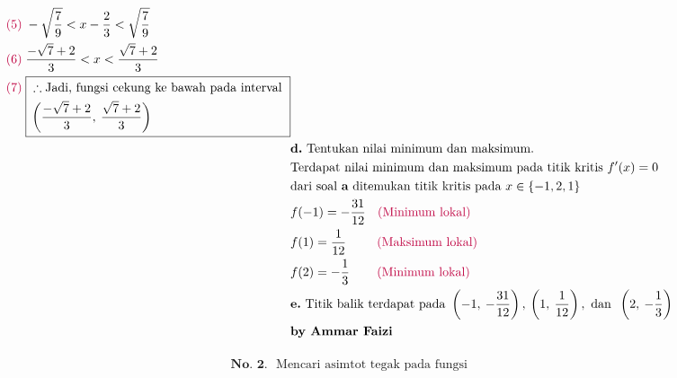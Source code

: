 \documentclass[13pt]{article}
\begin{document}
\begin{fleqn}[4em]
\begin{align*}
{\begin{aligned}
{\begin{aligned}[t]
    & {\color{purple}(5)}\; -\sqrt{\frac{7}{9}}<x-\frac{2}{3}<\sqrt{\frac{7}{9}} \\
    & {\color{purple}(6)}\; \frac{-\sqrt{7}+2}{3}<x<\frac{\sqrt{7}+2}{3} \\
    & {\color{purple}(7)}\; \boxed{
      \begin{aligned}[t]
        & \therefore \text{Jadi, fungsi cekung ke bawah pada interval } \\
        & \left(\frac{-\sqrt{7}+2}{3},\:\frac{\sqrt{7}+2}{3}\right)
      \end{aligned} 
    }
  \end{aligned}} \\
  & \textbf{d.} \text{ Tentukan nilai minimum dan maksimum.} \\
  & \text{Terdapat nilai minimum dan maksimum pada titik kritis } f'(x) = 0 \\
  & \text{dari soal } \textbf{a} \text{ ditemukan titik kritis pada } x \in \left\{-1, 2, 1\right\} \\
  & f(-1) = -\frac{31}{12}\:~\:\,\text{\color{purple} (Minimum lokal)}\\
  & f(1)  = \frac{1}{12}\:~\:~\:~\:~\:\text{\color{purple} (Maksimum lokal)}\\
  & f(2)  = -\frac{1}{3}\:~\:~\:~\:\;\text{\color{purple} (Minimum lokal)}\\
  & \textbf{e.} \text{ Titik balik terdapat pada } \left(-1,\:-\frac{31}{12}\right),\:\left(1,\:\frac{1}{12}\right), \text{ dan } \:\left(2,\:-\frac{1}{3}\right)
  \\ & \textbf{by Ammar Faizi}
\end{aligned}}
\end{align*}

\begin{align*}
\boxed{\begin{aligned}
  & \textbf{No. 2. } \text{ Mencari asimtot tegak pada fungsi } \\
\end{aligned}}
\end{align*}

\end{fleqn}
\end{document}
